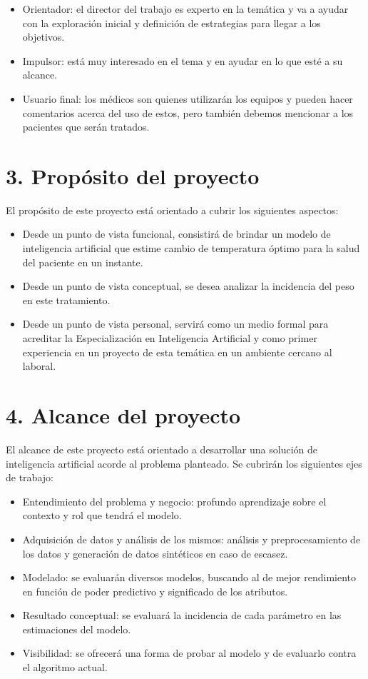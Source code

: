 \documentclass[
11pt, %
]{charter}
\begin{document}
\begin{itemize}
	\item Orientador: el director del trabajo es experto en la temática y va a ayudar con la exploración inicial y definición de estrategias para llegar a los objetivos.
	\item Impulsor: está muy interesado en el tema y en ayudar en lo que esté a su alcance.
	\item Usuario final: los médicos son quienes utilizarán los equipos y pueden  hacer comentarios acerca del uso de estos, pero también debemos mencionar a los pacientes que serán tratados.
\end{itemize}


\section{3. Propósito del proyecto}
\label{sec:proposito}
	
El propósito de este proyecto está orientado a cubrir los siguientes aspectos:
\begin{itemize}
	\item Desde un punto de vista funcional, consistirá de brindar un modelo de inteligencia artificial que estime cambio de temperatura óptimo para la salud del paciente en un instante.
	\item Desde un punto de vista conceptual, se desea analizar la incidencia del peso en este tratamiento.
	\item Desde un punto de vista personal, servirá como un medio formal para acreditar la Especialización en Inteligencia Artificial y como primer experiencia en un proyecto de esta temática en un ambiente cercano al laboral.	
\end{itemize}



\section{4. Alcance del proyecto}
\label{sec:alcance}

El alcance de este proyecto está orientado a desarrollar una solución de inteligencia artificial acorde al problema planteado. Se cubrirán los siguientes ejes de trabajo:

\begin{itemize}
	\item Entendimiento del problema y negocio: profundo aprendizaje sobre el contexto y rol que tendrá el modelo.
	\item Adquisición de datos y análisis de los mismos: análisis y preprocesamiento de los datos y generación de datos sintéticos en caso de escasez.
	\item Modelado: se evaluarán diversos modelos, buscando al de mejor rendimiento en función de poder predictivo y significado de los atributos.
	\item Resultado conceptual: se evaluará la incidencia de cada parámetro en las estimaciones del modelo.
	\item Visibilidad: se ofrecerá una forma de probar al modelo y de evaluarlo contra el algoritmo actual.
\end{itemize}
\end{document}
